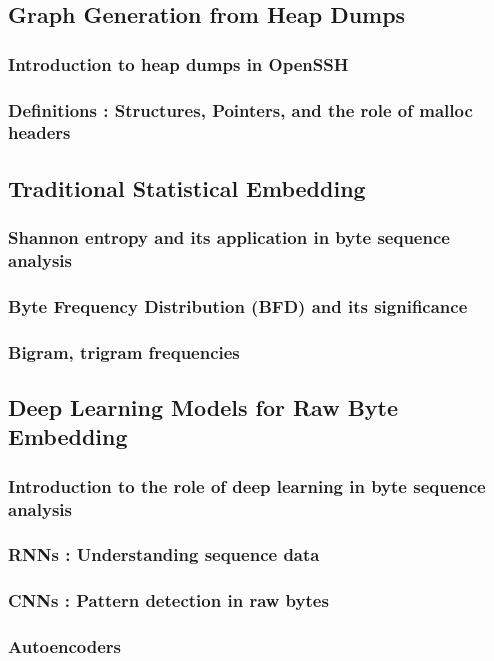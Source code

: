\subsection{Graph Generation from Heap Dumps}
    \subsubsection{Introduction to heap dumps in OpenSSH}
    \subsubsection{Definitions : Structures, Pointers, and the role of malloc headers}
\subsection{Traditional Statistical Embedding}
    \subsubsection{Shannon entropy and its application in byte sequence analysis}
    \subsubsection{Byte Frequency Distribution (BFD) and its significance}
    \subsubsection{Bigram, trigram frequencies}
\subsection{Deep Learning Models for Raw Byte Embedding}
    \subsubsection{Introduction to the role of deep learning in byte sequence analysis}
    \subsubsection{RNNs : Understanding sequence data}
    \subsubsection{CNNs : Pattern detection in raw bytes}
    \subsubsection{Autoencoders}
